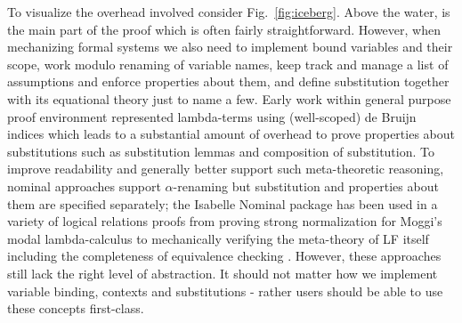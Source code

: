 To visualize the overhead involved consider Fig.~\ref{fig:iceberg}. Above the water, is the main part of the proof which is often fairly straightforward. However, when mechanizing formal systems we also need to implement bound variables and their scope, work modulo renaming of variable names, keep track and manage a list of assumptions and enforce properties about them, and define substitution together with its equational theory just to name a few. Early work \citep{Berardi:WLF90,CCoquand:92,Altenkirch:TLCA93}  within general purpose proof environment represented lambda-terms using (well-scoped) de Bruijn indices which leads to a substantial amount of overhead to prove properties about substitutions such as substitution lemmas and composition of substitution. 
To improve readability and generally better support such meta-theoretic reasoning, nominal approaches support $\alpha$-renaming but substitution and properties about them are specified separately; the Isabelle Nominal package \citep{Urban:JAR08} has been used in a variety of logical relations proofs from proving strong normalization for Moggi's modal lambda-calculus \citep{Doczkal:LFMTP09} to mechanically verifying the meta-theory of LF itself including the completeness of equivalence checking \citep{Narboux:LFMTP08,Urban:TOCL11}.  However,  these approaches still lack the right level of abstraction. It should not matter how we implement variable binding, contexts and substitutions - rather users should be able to use these concepts first-class.

